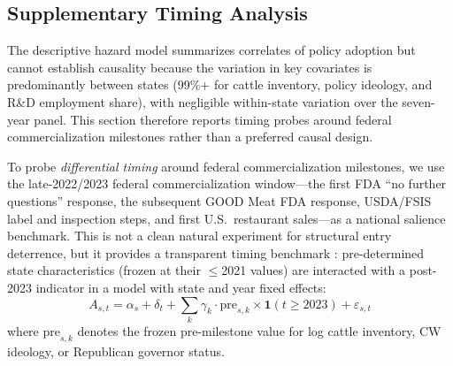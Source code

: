 \documentclass[12pt]{article}
\begin{document}
\begin{appendices}



\section{Supplementary Timing Analysis}
\label{app:supp_timing}

The descriptive hazard model summarizes correlates of policy adoption but cannot establish causality because the variation in key covariates is predominantly between states (99\%+ for cattle inventory, policy ideology, and R\&D employment share), with negligible within-state variation over the seven-year panel.  This section therefore reports timing probes around federal commercialization milestones rather than a preferred causal design.

To probe \emph{differential timing} around federal commercialization milestones, we use the late-2022/2023 federal commercialization window---the first FDA ``no further questions'' response, the subsequent GOOD Meat FDA response, USDA/FSIS label and inspection steps, and first U.S.\ restaurant sales---as a national salience benchmark.  This is not a clean natural experiment for structural entry deterrence, but it provides a transparent timing benchmark \citep{borusyak2022quasi,bertrand2004did}: pre-determined state characteristics (frozen at their $\leq$2021 values) are interacted with a post-2023 indicator in a model with state and year fixed effects:
\begin{equation}
    A_{s,t} = \alpha_s + \delta_t + \sum_k \gamma_k \cdot \text{pre}_{s,k} \times \mathbf{1}(t \geq 2023) + \varepsilon_{s,t}
    \label{eq:did}
\end{equation}
where $\text{pre}_{s,k}$ denotes the frozen pre-milestone value for log cattle inventory, CW ideology, or Republican governor status.


\end{appendices}
\end{document}
